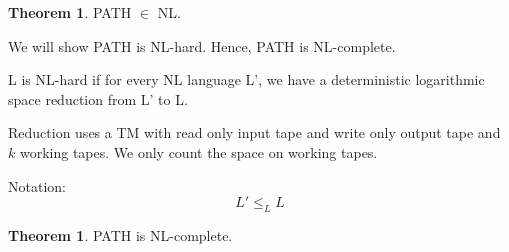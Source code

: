 \documentclass[a4paper,12pt]{article}
\theoremstyle{definition}
\newtheorem{theorem}[counter]{Theorem}
\theoremstyle{remark}
\begin{document}
\begin{theorem}
    PATH $\in$ NL.
\end{theorem}

We will show PATH is NL-hard. Hence, PATH is NL-complete.

L is NL-hard if for every NL language L', we have a deterministic logarithmic space reduction from L' to L.

Reduction uses a TM with read only input tape and write only output tape and $k$ working tapes. We only count the space on working tapes.

Notation:
\begin{equation*}
    L' \leq_L L
\end{equation*}

\begin{theorem}
    PATH is NL-complete.
\end{theorem}
\end{document}
